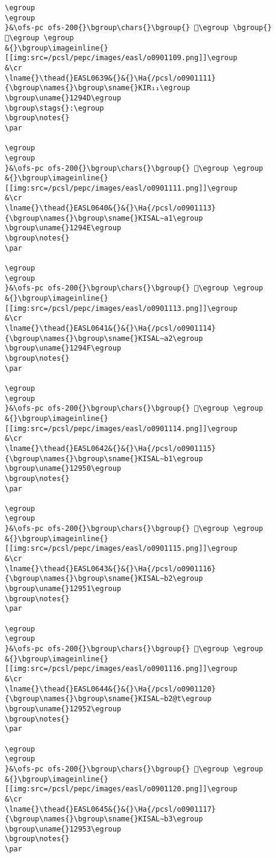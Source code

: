 \begin{verbatim}
\egroup
\egroup
}&\ofs-pc ofs-200{}\bgroup\chars{}\bgroup{} 𒥋\egroup \bgroup{} 𒥌\egroup \egroup
&{}\bgroup\imageinline{}[[img:src=/pcsl/pepc/images/easl/o0901109.png]]\egroup
&\cr
\lname{}\thead{}EASL0639&{}&{}\Ha{/pcsl/o0901111}{\bgroup\names{}\bgroup\sname{}KIR₁₁\egroup
\bgroup\uname{}1294D\egroup
\bgroup\stags{}:\egroup
\bgroup\notes{}
\par 

\egroup
\egroup
}&\ofs-pc ofs-200{}\bgroup\chars{}\bgroup{} 𒥍\egroup \egroup
&{}\bgroup\imageinline{}[[img:src=/pcsl/pepc/images/easl/o0901111.png]]\egroup
&\cr
\lname{}\thead{}EASL0640&{}&{}\Ha{/pcsl/o0901113}{\bgroup\names{}\bgroup\sname{}KISAL∼a1\egroup
\bgroup\uname{}1294E\egroup
\bgroup\notes{}
\par 

\egroup
\egroup
}&\ofs-pc ofs-200{}\bgroup\chars{}\bgroup{} 𒥎\egroup \egroup
&{}\bgroup\imageinline{}[[img:src=/pcsl/pepc/images/easl/o0901113.png]]\egroup
&\cr
\lname{}\thead{}EASL0641&{}&{}\Ha{/pcsl/o0901114}{\bgroup\names{}\bgroup\sname{}KISAL∼a2\egroup
\bgroup\uname{}1294F\egroup
\bgroup\notes{}
\par 

\egroup
\egroup
}&\ofs-pc ofs-200{}\bgroup\chars{}\bgroup{} 𒥏\egroup \egroup
&{}\bgroup\imageinline{}[[img:src=/pcsl/pepc/images/easl/o0901114.png]]\egroup
&\cr
\lname{}\thead{}EASL0642&{}&{}\Ha{/pcsl/o0901115}{\bgroup\names{}\bgroup\sname{}KISAL∼b1\egroup
\bgroup\uname{}12950\egroup
\bgroup\notes{}
\par 

\egroup
\egroup
}&\ofs-pc ofs-200{}\bgroup\chars{}\bgroup{} 𒥐\egroup \egroup
&{}\bgroup\imageinline{}[[img:src=/pcsl/pepc/images/easl/o0901115.png]]\egroup
&\cr
\lname{}\thead{}EASL0643&{}&{}\Ha{/pcsl/o0901116}{\bgroup\names{}\bgroup\sname{}KISAL∼b2\egroup
\bgroup\uname{}12951\egroup
\bgroup\notes{}
\par 

\egroup
\egroup
}&\ofs-pc ofs-200{}\bgroup\chars{}\bgroup{} 𒥑\egroup \egroup
&{}\bgroup\imageinline{}[[img:src=/pcsl/pepc/images/easl/o0901116.png]]\egroup
&\cr
\lname{}\thead{}EASL0644&{}&{}\Ha{/pcsl/o0901120}{\bgroup\names{}\bgroup\sname{}KISAL∼b2@t\egroup
\bgroup\uname{}12952\egroup
\bgroup\notes{}
\par 

\egroup
\egroup
}&\ofs-pc ofs-200{}\bgroup\chars{}\bgroup{} 𒥒\egroup \egroup
&{}\bgroup\imageinline{}[[img:src=/pcsl/pepc/images/easl/o0901120.png]]\egroup
&\cr
\lname{}\thead{}EASL0645&{}&{}\Ha{/pcsl/o0901117}{\bgroup\names{}\bgroup\sname{}KISAL∼b3\egroup
\bgroup\uname{}12953\egroup
\bgroup\notes{}
\par 


\end{verbatim}
